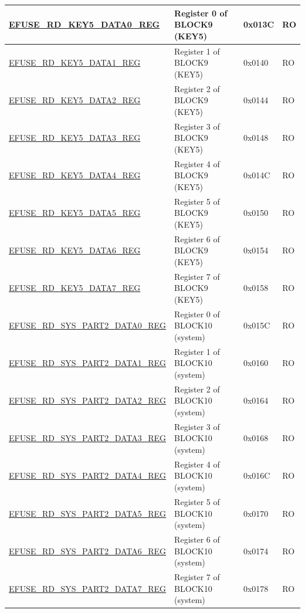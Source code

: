 \begin{longtable}{ | p{6.8cm} | p{7cm} | p{1.3cm} | p{1.2cm} | }
\hyperref[regdesc:EFUSERDKEY5DATA0REG]{EFUSE\_RD\_KEY5\_DATA0\_REG} & Register 0 of BLOCK9 (KEY5) & 0x013C & RO \\ \hline
\hyperref[regdesc:EFUSERDKEY5DATA1REG]{EFUSE\_RD\_KEY5\_DATA1\_REG} & Register 1 of BLOCK9 (KEY5) & 0x0140 & RO \\ \hline
\hyperref[regdesc:EFUSERDKEY5DATA2REG]{EFUSE\_RD\_KEY5\_DATA2\_REG} & Register 2 of BLOCK9 (KEY5) & 0x0144 & RO \\ \hline
\hyperref[regdesc:EFUSERDKEY5DATA3REG]{EFUSE\_RD\_KEY5\_DATA3\_REG} & Register 3 of BLOCK9 (KEY5) & 0x0148 & RO \\ \hline
\hyperref[regdesc:EFUSERDKEY5DATA4REG]{EFUSE\_RD\_KEY5\_DATA4\_REG} & Register 4 of BLOCK9 (KEY5) & 0x014C & RO \\ \hline
\hyperref[regdesc:EFUSERDKEY5DATA5REG]{EFUSE\_RD\_KEY5\_DATA5\_REG} & Register 5 of BLOCK9 (KEY5) & 0x0150 & RO \\ \hline
\hyperref[regdesc:EFUSERDKEY5DATA6REG]{EFUSE\_RD\_KEY5\_DATA6\_REG} & Register 6 of BLOCK9 (KEY5) & 0x0154 & RO \\ \hline
\hyperref[regdesc:EFUSERDKEY5DATA7REG]{EFUSE\_RD\_KEY5\_DATA7\_REG} & Register 7 of BLOCK9 (KEY5) & 0x0158 & RO \\ \hline
\hyperref[regdesc:EFUSERDSYSPART2DATA0REG]{EFUSE\_RD\_SYS\_PART2\_DATA0\_REG} & Register 0 of BLOCK10 (system) & 0x015C & RO \\ \hline
\hyperref[regdesc:EFUSERDSYSPART2DATA1REG]{EFUSE\_RD\_SYS\_PART2\_DATA1\_REG} & Register 1 of BLOCK10 (system) & 0x0160 & RO \\ \hline
\hyperref[regdesc:EFUSERDSYSPART2DATA2REG]{EFUSE\_RD\_SYS\_PART2\_DATA2\_REG} & Register 2 of BLOCK10 (system) & 0x0164 & RO \\ \hline
\hyperref[regdesc:EFUSERDSYSPART2DATA3REG]{EFUSE\_RD\_SYS\_PART2\_DATA3\_REG} & Register 3 of BLOCK10 (system) & 0x0168 & RO \\ \hline
\hyperref[regdesc:EFUSERDSYSPART2DATA4REG]{EFUSE\_RD\_SYS\_PART2\_DATA4\_REG} & Register 4 of BLOCK10 (system) & 0x016C & RO \\ \hline
\hyperref[regdesc:EFUSERDSYSPART2DATA5REG]{EFUSE\_RD\_SYS\_PART2\_DATA5\_REG} & Register 5 of BLOCK10 (system) & 0x0170 & RO \\ \hline
\hyperref[regdesc:EFUSERDSYSPART2DATA6REG]{EFUSE\_RD\_SYS\_PART2\_DATA6\_REG} & Register 6 of BLOCK10 (system) & 0x0174 & RO \\ \hline
\hyperref[regdesc:EFUSERDSYSPART2DATA7REG]{EFUSE\_RD\_SYS\_PART2\_DATA7\_REG} & Register 7 of BLOCK10 (system) & 0x0178 & RO \\ \hline

\end{longtable}
